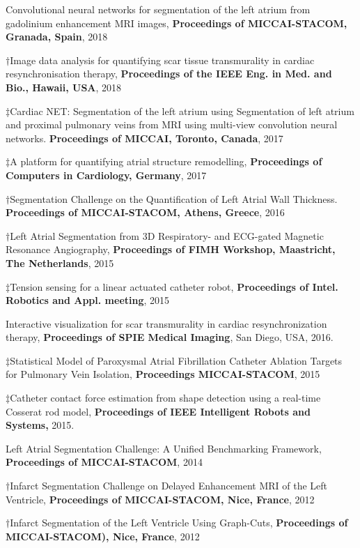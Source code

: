 \begin{etaremune} 
\item *Convolutional neural networks for segmentation of the left atrium from gadolinium enhancement MRI images, \textbf{Proceedings of MICCAI-STACOM, Granada, Spain}, 2018 
\item $\dagger$Image data analysis for quantifying scar tissue transmurality in cardiac resynchronisation therapy, \textbf{Proceedings of the IEEE Eng. in Med. and Bio., Hawaii, USA}, 2018
\item $\ddagger$Cardiac NET: Segmentation of the left atrium using Segmentation of left atrium and proximal pulmonary veins from MRI using multi-view convolution neural networks. \textbf{Proceedings of MICCAI, Toronto, Canada}, 2017
\item $\ddagger$A platform for quantifying atrial structure remodelling, \textbf{Proceedings of Computers in Cardiology, Germany}, 2017
\item $\dagger$Segmentation Challenge on the Quantification of Left Atrial Wall Thickness. \textbf{Proceedings of MICCAI-STACOM, Athens, Greece}, 2016
\item $\dagger$Left Atrial Segmentation from 3D Respiratory- and ECG-gated Magnetic Resonance Angiography, \textbf{Proceedings of FIMH Workshop, Maastricht, The Netherlands}, 2015 
	\item $\ddagger$Tension sensing for a linear actuated catheter robot, \textbf{Proceedings of Intel. Robotics and Appl. meeting}, 2015
	\item Interactive visualization for scar transmurality in cardiac resynchronization therapy, \textbf{Proceedings of SPIE Medical Imaging}, San Diego, USA, 2016. 
	\item $\ddagger$Statistical Model of Paroxysmal Atrial Fibrillation Catheter Ablation Targets for Pulmonary Vein Isolation, \textbf{Proceedings MICCAI-STACOM}, 2015
	\item $\ddagger$Catheter contact force estimation from shape detection using a real-time Cosserat rod model, \textbf{Proceedings of IEEE Intelligent Robots and Systems,} 2015.
	\item Left Atrial Segmentation Challenge: A Unified Benchmarking Framework, \textbf{Proceedings of MICCAI-STACOM}, 2014
	\item $\dagger$Infarct Segmentation Challenge on Delayed Enhancement MRI of the Left Ventricle, \textbf{Proceedings of MICCAI-STACOM, Nice, France}, 2012 
	\item $\dagger$Infarct Segmentation of the Left Ventricle Using Graph-Cuts, \textbf{Proceedings of MICCAI-STACOM), Nice, France}, 2012

\end{etaremune}
